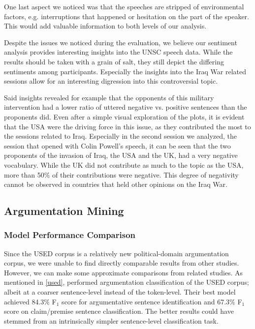 One last aspect we noticed was that the speeches are stripped of environmental factors, e.g. interruptions that happened or hesitation on the part of the speaker. This would add valuable information to both levels of our analysis.

Despite the issues we noticed during the evaluation, we believe our sentiment analysis provides interesting insights into the UNSC speech data. While the results should be taken with a grain of salt, they still depict the differing sentiments among participants. Especially the insights into the Iraq War related sessions allow for an interesting digression into this controversial topic.

Said insights revealed for example that the opponents of this military intervention had a lower ratio of uttered negative vs. positive sentences than the proponents did. Even after a simple visual exploration of the plots, it is evident that the USA were the driving force in this issue, as they contributed the most to the sessions related to Iraq. Especially in the second session we analyzed, the session that opened with Colin Powell's speech, it can be seen that the two proponents of the invasion of Iraq, the USA and the UK, had a very negative vocabulary. While the UK did not contribute as much to the topic as the USA, more than 50\% of their contributions were negative. This degree of negativity cannot be observed in countries that held other opinions on the Iraq War. 

\subsection{Argumentation Mining}

\subsubsection{Model Performance Comparison}

Since the USED corpus is a relatively new political-domain argumentation corpus, we were unable to find directly comparable results from other studies. However, we can make some approximate comparisons from related studies. As mentioned in \ref{used}, \citet{haddadan-etal-2019-yes} performed argumentation classification of the USED corpus; albeit at a coarser sentence-level instead of the token-level. Their best model achieved 84.3$\%$ F$_1$ score for argumentative sentence identification and 67.3$\%$ F$_1$ score on claim/premise sentence classification. The better results could have stemmed from an intrinsically simpler sentence-level classification task.

